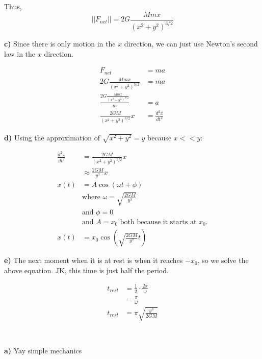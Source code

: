\documentclass{article}
\begin{document}
Thus,
$$
||F_{net}|| = 2G\frac{Mm x}{(x^2+y^2)^{3/2}}
$$

\vspace{1cm}
\large\textbf{c)} Since there is only motion in the $x$ direction, we can just use Newton's second law in the $x$ direction.

\begin{align*}
    F_{net} &= ma \\
    2G\frac{Mm x}{(x^2+y^2)^{3/2}} &= ma \\
    \frac{2G\frac{Mm x}{(x^2+y^2)^{3/2}}}{m} &= a\\
    \frac{2GM}{(x^2+y^2)^{3/2}}x &= \frac{d^2x}{dt^2}
\end{align*}

\vspace{1cm}
\large\textbf{d)} Using the approximation of $\sqrt{x^2+y^2}=y$ because $x<<y$:

\begin{align*}
    \frac{d^2 x}{dt^2} &= \frac{2GM}{({x^2+y^2})^{3/2}}x \\
    &\approx \frac{2GM}{y^3}x \\
    x(t) &= A\cos(\omega t + \phi) \\ 
    &\text{where } \omega = \sqrt{\frac{2GM}{y^3}}\\
    &\text{and } \phi = 0 \\
    &\text{and } A = x_0 \text{ both because it starts at } x_0.\\
    x(t) &= x_0\cos\left(\sqrt{\frac{2GM}{y^3}}t\right)
\end{align*}

\vspace{1cm}
\large\textbf{e)} The next moment when it is at rest is when it reaches $-x_0$, so we solve the above equation. JK, this time is just half the period.

\begin{align*}
    t_{rest} &= \frac{1}{2}\cdot\frac{2\pi}{\omega} \\
    &= \frac{\pi}{\omega} \\
    t_{rest} &= \pi\sqrt{\frac{y^3}{2GM}} \\
\end{align*}

\newpage
\section{}

\vspace{1cm}
\large\textbf{a)} Yay simple mechanics
\end{document}
